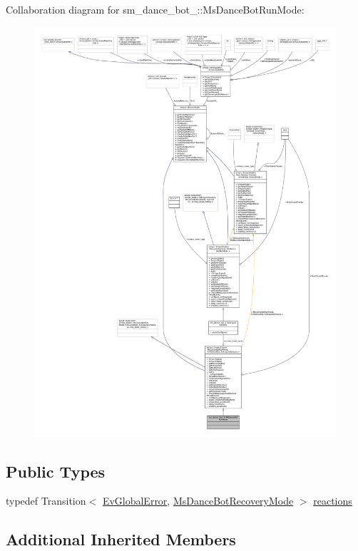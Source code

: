 Collaboration diagram for sm\+\_\+dance\+\_\+bot\+\_\+:\+:Ms\+Dance\+Bot\+Run\+Mode\+:
\nopagebreak
\begin{figure}[H]
\begin{center}
\leavevmode
\includegraphics[width=350pt]{classsm__dance__bot__3_1_1MsDanceBotRunMode__coll__graph}
\end{center}
\end{figure}
\subsection*{Public Types}
\begin{DoxyCompactItemize}
\item 
typedef Transition$<$ \hyperlink{structsm__dance__bot__3_1_1EvGlobalError}{Ev\+Global\+Error}, \hyperlink{classsm__dance__bot__3_1_1MsDanceBotRecoveryMode}{Ms\+Dance\+Bot\+Recovery\+Mode} $>$ \hyperlink{classsm__dance__bot__3_1_1MsDanceBotRunMode_a46456b0d07e3e339cb6bafb68c923cca}{reactions}
\end{DoxyCompactItemize}
\subsection*{Additional Inherited Members}


